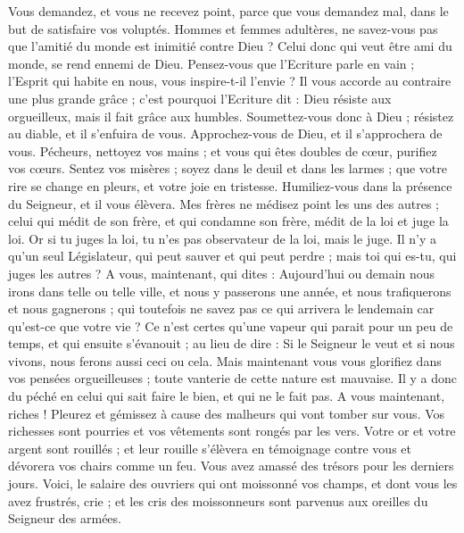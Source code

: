 \begin{multicols}{2}
Vous demandez, et vous ne recevez point, parce que vous demandez mal, dans le but de satisfaire vos voluptés.
Hommes et femmes adultères, ne savez-vous pas que l'amitié du monde est inimitié contre Dieu ? Celui donc qui veut être ami du monde, se rend ennemi de Dieu.
Pensez-vous que l'Ecriture parle en vain ; l'Esprit qui habite en nous, vous inspire-t-il l'envie ?
Il vous accorde au contraire une plus grande grâce ; c'est pourquoi l'Ecriture dit : Dieu résiste aux orgueilleux, mais il fait grâce aux humbles.
Soumettez-vous donc à Dieu ; résistez au diable, et il s'enfuira de vous.
Approchez-vous de Dieu, et il s'approchera de vous. Pécheurs, nettoyez vos mains ; et vous qui êtes doubles de cœur, purifiez vos cœurs.
Sentez vos misères ; soyez dans le deuil et dans les larmes ; que votre rire se change en pleurs, et votre joie en tristesse.
Humiliez-vous dans la présence du Seigneur, et il vous élèvera.
Mes frères ne médisez point les uns des autres ; celui qui médit de son frère, et qui condamne son frère, médit de la loi et juge la loi. Or si tu juges la loi, tu n'es pas observateur de la loi, mais le juge.
Il n'y a qu'un seul Législateur, qui peut sauver et qui peut perdre ; mais toi qui es-tu, qui juges les autres ?
A vous, maintenant, qui dites : Aujourd'hui ou demain nous irons dans telle ou telle ville, et nous y passerons une année, et nous trafiquerons et nous gagnerons ;
qui toutefois ne savez pas ce qui arrivera le lendemain car qu'est-ce que votre vie ? Ce n'est certes qu'une vapeur qui parait pour un peu de temps, et qui ensuite s'évanouit ;
au lieu de dire : Si le Seigneur le veut et si nous vivons, nous ferons aussi ceci ou cela.
Mais maintenant vous vous glorifiez dans vos pensées orgueilleuses ; toute vanterie de cette nature est mauvaise.
Il y a donc du péché en celui qui sait faire le bien, et qui ne le fait pas.
\VerseOne{}A vous maintenant, riches ! Pleurez et gémissez à cause des malheurs qui vont tomber sur vous.
Vos richesses sont pourries et vos vêtements sont rongés par les vers.
Votre or et votre argent sont rouillés ; et leur rouille s'élèvera en témoignage contre vous et dévorera vos chairs comme un feu. Vous avez amassé des trésors pour les derniers jours.
Voici, le salaire des ouvriers qui ont moissonné vos champs, et dont vous les avez frustrés, crie ; et les cris des moissonneurs sont parvenus aux oreilles du Seigneur des armées.

\end{multicols}
